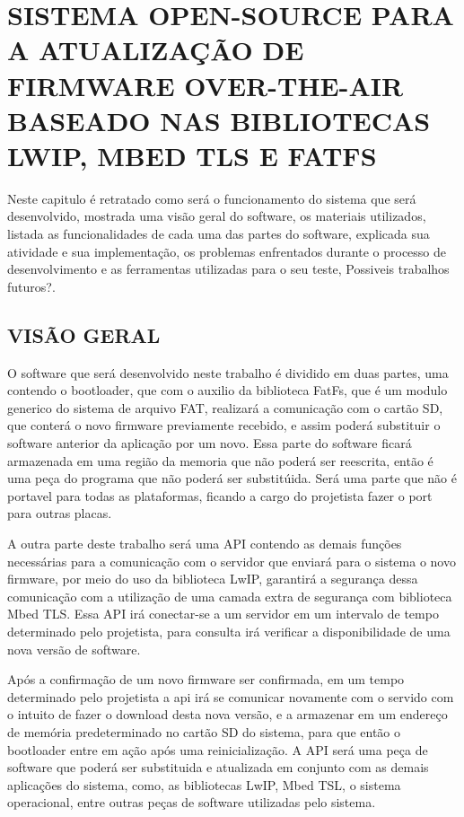 
\chapter{SISTEMA OPEN-SOURCE PARA A ATUALIZAÇÃO DE FIRMWARE OVER-THE-AIR BASEADO NAS BIBLIOTECAS LWIP, MBED TLS E FATFS}
\label{chap:metodologia}
Neste capitulo é retratado como será o funcionamento do sistema que será desenvolvido, mostrada uma visão geral do software, os materiais utilizados, listada as funcionalidades de cada uma das partes do software, explicada sua atividade e sua implementação, os problemas enfrentados durante o processo de desenvolvimento e as ferramentas utilizadas para o seu teste, Possiveis trabalhos futuros?. 

\section{VISÃO GERAL}
O software que será desenvolvido neste trabalho é dividido em duas partes, uma contendo o bootloader, que com o auxilio da biblioteca FatFs, que é um modulo generico do sistema de arquivo FAT, realizará a comunicação com o cartão SD, que conterá o novo firmware previamente recebido, e assim poderá substituir o software anterior da aplicação por um novo. Essa parte do software ficará armazenada em uma região da memoria que não poderá ser reescrita, então é uma peça do programa que não poderá ser substitúida. Será uma parte que não é portavel para todas as plataformas, ficando a cargo do projetista fazer o port para outras placas.

A outra parte deste trabalho será uma API contendo as demais funções necessárias para a comunicação com o servidor que enviará para o sistema o novo firmware, por meio do uso da biblioteca LwIP, garantirá a segurança dessa comunicação com a utilização de uma camada extra de segurança com biblioteca Mbed TLS. Essa API irá conectar-se a um servidor em um intervalo de tempo determinado pelo projetista, para consulta irá verificar a disponibilidade de uma nova versão de software. 

Após a confirmação de um novo firmware ser confirmada, em um tempo determinado pelo projetista a api irá se comunicar novamente com o servido com o intuito de fazer o download desta nova versão, e a armazenar em um endereço de memória predeterminado no cartão SD do sistema, para que então o bootloader entre em ação após uma reinicialização.
A API será uma peça de software que poderá ser substituida e atualizada em conjunto com as demais aplicações do sistema, como, as bibliotecas LwIP, Mbed TSL, o sistema operacional, entre outras peças de software utilizadas pelo sistema. 

